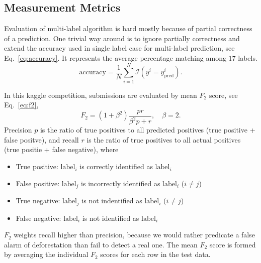\documentclass[11pt,oneside,a4paper]{article}
\begin{document}
\subsection{Measurement Metrics}
Evaluation of multi-label algorithm is hard mostly because of partial correctness of a prediction. One trivial way around is to ignore partially correctness and extend the accuracy used in single label case for multi-label prediction, see Eq.~\ref{eq:accuracy}. It represents the average percentage matching among $17$ labels.
\begin{equation}
\mathrm{accuracy} = \frac{1}{N}\sum^{N}_{i = 1}\mathcal{I}(y^i = y^i_{\mathrm{pred}})\label{eq:accuracy}.
\end{equation}

In this kaggle competition, submissions are evaluated by mean $F_2$ score, see Eq.~\ref{eq:f2},
\begin{equation}
F_{2} = (1+\beta^{2})\frac{pr}{\beta^2 p + r}, \quad \beta = 2 \label{eq:f2}.
\end{equation}
Precision $p$ is the ratio of true positives to all predicted positives (true positive + false positve), and recall $r$ is the ratio of true positives to all actual positives (true positie + false negative), where
\begin{itemize}
\item True positive:  $\mathrm{label}_i$ is correctly identified as $\mathrm{label}_i$
\item False positive: $\mathrm{label}_j$ is incorrectly identified as $\mathrm{label}_i$ ($i\neq j$)
\item True negative:  $\mathrm{label}_j$ is not indentified as $\mathrm{label}_i$ ($i\neq j$)
\item False negative: $\mathrm{label}_i$ is not identified as $\mathrm{label}_i$
\end{itemize}
$F_2$ weights recall higher than precision, because we would rather predicate a false alarm of deforestation than fail to detect a real one. The mean $F_2$ score is formed by averaging the individual $F_2$ scores for each row in the test data. 
\end{document}
